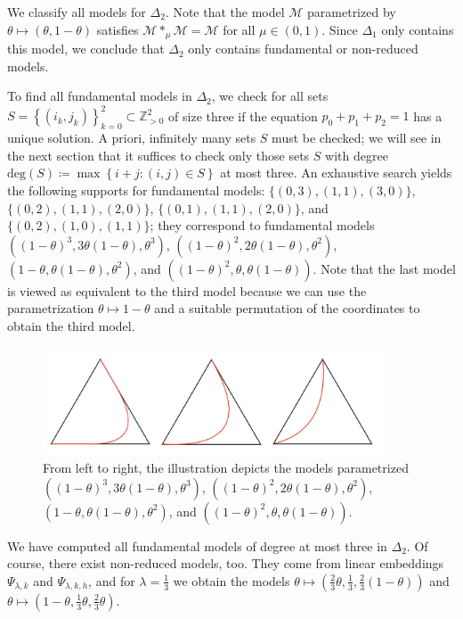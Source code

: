 \begin{example}
We classify all models for \( \Delta_2 \). Note that the model \( \mathcal{M} \) parametrized by \( \theta \mapsto (\theta, 1-\theta) \) satisfies \( \mathcal{M} *_\mu \mathcal{M} = \mathcal{M} \) for all \( \mu \in (0,1) \). Since \( \Delta_1 \) only contains this model, we conclude that \( \Delta_2 \) only contains fundamental or non-reduced models.

To find all fundamental models in \( \Delta_2 \), we check for all sets \( S = \left\{ (i_k,j_k)\right\}_{k=0}^2 \subset \mathbb{Z}^2_{>0} \) of size three if the equation \( p_0 + p_1 + p_2 = 1 \) has a unique solution. A priori, infinitely many sets \( S \) must be checked; we will see in the next section that it suffices to check only those sets \( S \) with degree \( \mathrm{deg}(S) \coloneqq \max\left\{ i+j : (i,j) \in S \right\}  \) at most three. An exhaustive search yields the following supports for fundamental models: \( \{ (0,3), (1,1), (3,0) \}\), \( \{ (0,2), (1,1), (2,0) \}\), \( \{ (0,1), (1,1), (2,0) \} \), and \( \{ (0,2),(1,0),(1,1) \} \); they correspond to fundamental models \( ((1-\theta)^3, 3\theta(1-\theta), \theta^3) \), \( ((1-\theta)^2, 2\theta(1-\theta), \theta^2) \), \( (1-\theta, \theta(1-\theta), \theta^2) \), and \( ((1-\theta)^2, \theta, \theta(1-\theta)) \).  Note that the last model is viewed as equivalent to the third model because we can use the parametrization \( \theta \mapsto 1-\theta \) and a suitable permutation of the coordinates to obtain the third model.

\begin{figure}[H]
    \centering
    \includegraphics[width=0.9\textwidth]{assets/fundamental-models-delta-2.png}
    \caption{From left to right, the illustration depicts the models parametrized \( ((1-\theta)^3, 3\theta(1-\theta), \theta^3) \), \( ((1-\theta)^2, 2\theta(1-\theta), \theta^2) \), \( (1-\theta, \theta(1-\theta), \theta^2) \), and \( ((1-\theta)^2, \theta, \theta(1-\theta)) \).}
\end{figure}

We have computed all fundamental models of degree at most three in \( \Delta_2 \). Of course, there exist non-reduced models, too. They come from linear embeddings \( \Psi_{\lambda,k} \) and \( \Psi_{\lambda,k,h} \), and for \( \lambda = \frac{1}{3} \) we obtain the models \( \theta \mapsto (\frac{2}{3}\theta, \frac{1}{3}, \frac{2}{3}(1 - \theta)) \) and \( \theta \mapsto (1-\theta, \frac{1}{3}\theta, \frac{2}{3}\theta) \).


\end{example}
